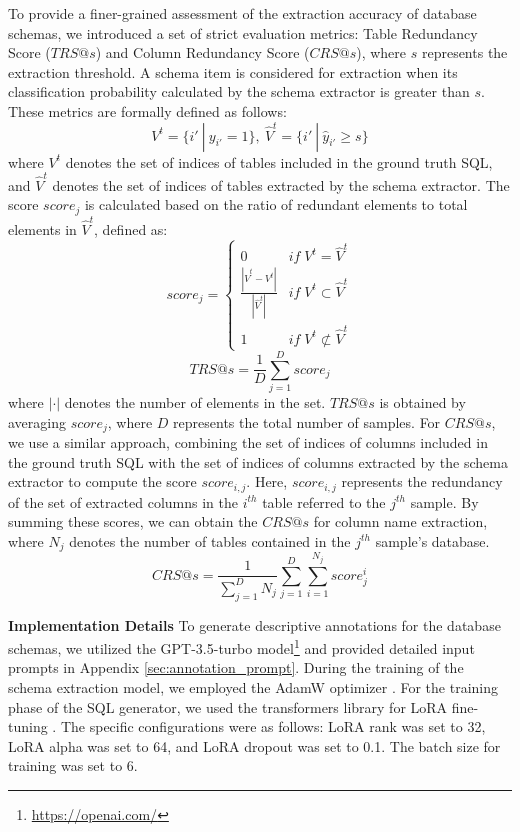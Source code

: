\documentclass[11pt]{article}
\begin{document}
To provide a finer-grained assessment of the extraction accuracy of database schemas, we introduced a set of strict evaluation metrics: Table Redundancy Score ($TRS@s$) and Column Redundancy Score ($CRS@s$), where $s$ represents the extraction threshold. A schema item is considered for extraction when its classification probability calculated by the schema extractor is greater than $s$. These metrics are formally defined as follows:
\begin{equation}
    V^{t}=\{{i}' \ |\  {y}_{{i}'}=1  \},\ \hat{V}^{t}=\{{i}' \ | \ \hat{y}_{{i}'}\ge s\}
\end{equation}
where $V^{t}$ denotes the set of indices of tables included in the ground truth SQL, and $\hat{V}^{t}$ denotes the set of indices of tables extracted by the schema extractor. The score $score_{j}$ is calculated based on the ratio of redundant elements to total elements in $\hat{V}^{t}$, defined as:
\begin{equation}
    \left.score_{j}=\left\{\begin{matrix}0& if \; V^{t}=\hat{V}^{t}
     \\\frac{|\hat{{V}}^{t} - V^{t}|}{|\hat{V}^{t}|}&if \; V^{t}\subset \hat{V}^{t} \\1 & if \; V^{t}\not\subset \hat{V}^{t} \end{matrix}\right.\right.
\end{equation}
\begin{equation}
    TRS@s=\frac{1}{D} \sum_{j=1}^{D} score_{j}
\end{equation}
where $|\cdot|$ denotes the number of elements in the set. $TRS@s$ is obtained by averaging $score_{j}$, where $D$ represents the total number of samples. For $CRS@s$, we use a similar approach, combining the set of indices of columns included in the ground truth SQL with the set of indices of columns extracted by the schema extractor to compute the score $score_{i,j}$. Here, $score_{i,j}$ represents the redundancy of the set of extracted columns in the $i^{th}$ table referred to the $j^{th}$ sample. By summing these scores, we can obtain the $CRS@s$ for column name extraction, where $N_{j}$ denotes the number of tables contained in the $j^{th}$ sample's database.
\begin{equation}
    CRS@s=\frac{1}{\sum_{j=1}^{D}N_{j}  } \sum_{j=1}^{D} \sum_{i=1}^{N_{j}} score_{j}^{i}
\end{equation}

\vspace{4pt}
\noindent\textbf{Implementation Details}
To generate descriptive annotations for the database schemas, we utilized the GPT-3.5-turbo model\footnote{\url{https://openai.com/}} and provided detailed input prompts in Appendix \ref{sec:annotation_prompt}. During the training of the schema extraction model, we employed the AdamW optimizer \cite{loshchilov2019decoupledweightdecayregularization}.
For the training phase of the SQL generator, we used the transformers library for LoRA fine-tuning \cite{hu2021loralowrankadaptationlarge}. The specific configurations were as follows: LoRA rank was set to 32, LoRA alpha was set to 64, and LoRA dropout was set to 0.1. The batch size for training was set to 6.
\end{document}

